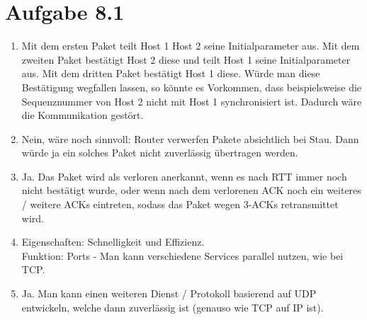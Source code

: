 \documentclass[12pt, a4paper]{article}
\begin{document}
\begin{center}\end{center}



\section*{Aufgabe 8.1}
\begin{enumerate}[label=\alph*)]
	\item	Mit dem ersten Paket teilt Host 1 Host 2 seine Initialparameter aus. Mit dem zweiten Paket bestätigt Host 2 diese und teilt Host 1 seine Initialparameter aus. Mit dem dritten Paket bestätigt Host 1 diese. Würde man diese Bestätigung wegfallen lassen, so könnte es Vorkommen, dass beispielsweise die Sequenznummer von Host 2 nicht mit Host 1 synchronisiert ist. Dadurch wäre die Kommunikation gestört.
	\item	Nein, wäre noch sinnvoll: Router verwerfen Pakete absichtlich bei Stau. Dann würde ja ein solches Paket nicht zuverlässig übertragen werden.
	\item	Ja. Das Paket wird als verloren anerkannt, wenn es nach RTT immer noch nicht bestätigt wurde, oder wenn nach dem verlorenen ACK noch ein weiteres / weitere ACKs eintreten, sodass das Paket wegen 3-ACKs retransmittet wird.
	\item	Eigenschaften: Schnelligkeit und Effizienz.\\
			Funktion: Ports - Man kann verschiedene Services parallel nutzen, wie bei TCP.
	\item	Ja. Man kann einen weiteren Dienst / Protokoll basierend auf UDP entwickeln, welche dann zuverlässig ist (genauso wie TCP auf IP ist).
\end{enumerate}


\newpage
\end{document}
